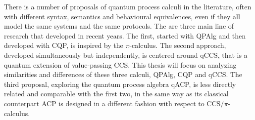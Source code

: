 There is a number of proposals of quantum process calculi in the literature, often with different syntax, semantics and behavioural equivalences, even if they all model the same systems and the same protocols. 
The are three main line of research that developed in recent years. The first, started with QPAlg and then developed with CQP, is inspired by the $\pi$-calculus. 
The second approach, developed simultaneously but independently, is centered around qCCS, that is a quantum extension of value-passing CCS. 
This thesis will focus on analyzing similarities and differences of these three calculi, QPAlg, CQP and qCCS. 
The third proposal, exploring the quantum process algebra qACP, is less directly related and comparable with the first two, in the same way as its classical counterpart ACP is designed in a different fashion with respect to CCS/$\pi$-calculus.
